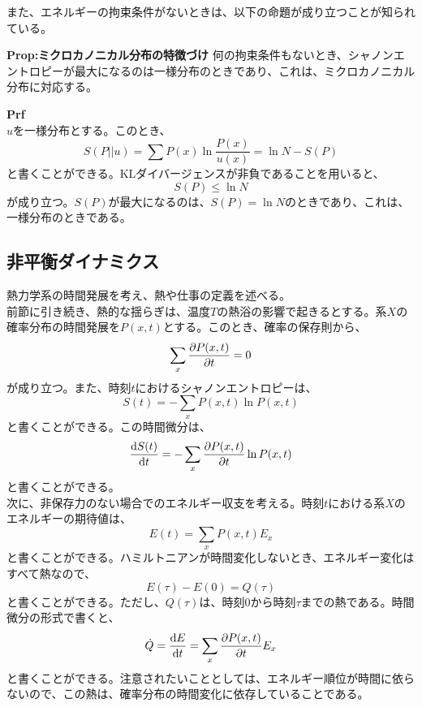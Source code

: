 \documentclass[a4paper,11pt]{jsarticle}
\numberwithin{equation}{section}
\begin{document}
また、エネルギーの拘束条件がないときは、以下の命題が成り立つことが知られている。
\begin{itembox}[l]{\textbf{Prop:ミクロカノニカル分布の特徴づけ}}
    何の拘束条件もないとき、シャノンエントロピーが最大になるのは一様分布のときであり、これは、ミクロカノニカル分布に対応する。
\end{itembox}
\textbf{Prf}\\
$u$を一様分布とする。このとき、
\begin{equation}
    S(P||u) = \sum P(x)\ln \frac{P(x)}{u(x)} = \ln N -S(P)
\end{equation}
と書くことができる。KLダイバージェンスが非負であることを用いると、
\begin{equation}
    S(P) \leq \ln N
\end{equation}
が成り立つ。$S(P)$が最大になるのは、$S(P) = \ln N$のときであり、これは、一様分布のときである。\\
\hfill \qedsymbol

\subsection{非平衡ダイナミクス}
熱力学系の時間発展を考え、熱や仕事の定義を述べる。\\
前節に引き続き、熱的な揺らぎは、温度$T$の熱浴の影響で起きるとする。系$X$の確率分布の時間発展を$P(x,t)$とする。このとき、確率の保存則から、
\begin{equation}
    \sum_x \pdv{P(x,t)}{t} = 0
\end{equation}
が成り立つ。また、時刻$t$におけるシャノンエントロピーは、
\begin{equation}
    S(t) = -\sum_x P(x,t)\ln P(x,t)
\end{equation}
と書くことができる。この時間微分は、
\begin{equation}
    \dv{S(t)}{t} = -\sum_x \pdv{P(x,t)}{t}\ln P(x,t) 
\end{equation}
と書くことができる。\\
次に、非保存力のない場合でのエネルギー収支を考える。時刻$t$における系$X$のエネルギーの期待値は、
\begin{equation}
    E(t) = \sum_x P(x,t)E_x
\end{equation}
と書くことができる。ハミルトニアンが時間変化しないとき、エネルギー変化はすべて熱なので、
\begin{equation}
    E(\tau) - E(0) = Q(\tau)
\end{equation}
と書くことができる。ただし、$Q(\tau)$は、時刻$0$から時刻$\tau$までの熱である。時間微分の形式で書くと、
\begin{equation}
    \dot{Q} = \dv{E}{t} = \sum_x \pdv{P(x,t)}{t}E_x
\end{equation}
と書くことができる。注意されたいこととしては、エネルギー順位が時間に依らないので、この熱は、確率分布の時間変化に依存していることである。\\
\end{document}
